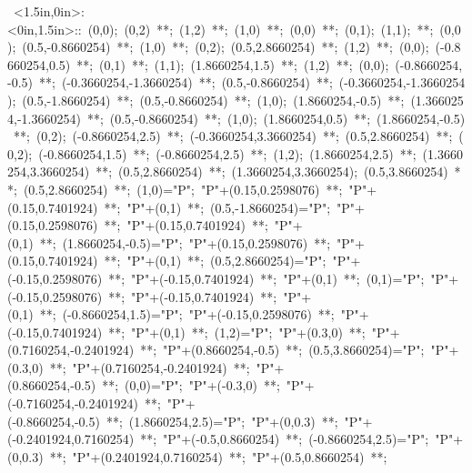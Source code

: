 
% 

\hbox{
\xy    <1.5in,0in>:<0in,1.5in>::
       (0,0); (0,2) **\dir{-}; (1,2) **\dir{-}; (1,0) **\dir{-}; 
       (0,0) **\dir{-}; (0,1); (1,1); **\dir{-};
       (0,0); (0.5,-0.8660254) **\dir{-}; (1,0) **\dir{-};
       (0,2); (0.5,2.8660254) **\dir{-}; (1,2) **\dir{-};
       (0,0); (-0.8660254,0.5) **\dir{-}; (0,1) **\dir{-}; 
       (1,1); (1.8660254,1.5) **\dir{-}; (1,2) **\dir{-}; 
       (0,0); (-0.8660254,-0.5) **\dir{-}; 
         (-0.3660254,-1.3660254) **\dir{-}; (0.5,-0.8660254) **\dir{-};
         (-0.3660254,-1.3660254);  (0.5,-1.8660254) **\dir{-}; 
         (0.5,-0.8660254) **\dir{-};
       (1,0); (1.8660254,-0.5) **\dir{-}; 
         (1.3660254,-1.3660254) **\dir{-}; (0.5,-0.8660254) **\dir{-};
         (1,0); (1.8660254,0.5) **\dir{-}; (1.8660254,-0.5) **\dir{-};
       (0,2); (-0.8660254,2.5) **\dir{-}; 
         (-0.3660254,3.3660254) **\dir{-}; (0.5,2.8660254) **\dir{-};
         (0,2); (-0.8660254,1.5) **\dir{-}; (-0.8660254,2.5) **\dir{-};
       (1,2); (1.8660254,2.5) **\dir{-}; 
         (1.3660254,3.3660254) **\dir{-}; (0.5,2.8660254) **\dir{-};
         (1.3660254,3.3660254);  (0.5,3.8660254) **\dir{-}; 
         (0.5,2.8660254) **\dir{-};
         (1,0)="P"; "P"+(0.15,0.2598076) **\dir{-};  
               "P"+(0.15,0.7401924) **\dir{-}; "P"+(0,1) **\dir{-};
         (0.5,-1.8660254)="P"; "P"+(0.15,0.2598076) **\dir{-};  
               "P"+(0.15,0.7401924) **\dir{-}; "P"+(0,1) **\dir{-};
         (1.8660254,-0.5)="P"; "P"+(0.15,0.2598076) **\dir{-};  
               "P"+(0.15,0.7401924) **\dir{-}; "P"+(0,1) **\dir{-};
         (0.5,2.8660254)="P"; "P"+(-0.15,0.2598076) **\dir{-};  
               "P"+(-0.15,0.7401924) **\dir{-}; "P"+(0,1) **\dir{-};
         (0,1)="P"; "P"+(-0.15,0.2598076) **\dir{-};  
               "P"+(-0.15,0.7401924) **\dir{-}; "P"+(0,1) **\dir{-};
         (-0.8660254,1.5)="P"; "P"+(-0.15,0.2598076) **\dir{-};  
               "P"+(-0.15,0.7401924) **\dir{-}; "P"+(0,1) **\dir{-};
         (1,2)="P"; "P"+(0.3,0) **\dir{-}; "P"+(0.7160254,-0.2401924) **\dir{-};
                "P"+(0.8660254,-0.5) **\dir{-};
         (0.5,3.8660254)="P"; "P"+(0.3,0) **\dir{-}; 
                "P"+(0.7160254,-0.2401924) **\dir{-};
                "P"+(0.8660254,-0.5) **\dir{-};
         (0,0)="P"; "P"+(-0.3,0) **\dir{-}; "P"+(-0.7160254,-0.2401924) **\dir{-};
                "P"+(-0.8660254,-0.5) **\dir{-};
         (1.8660254,2.5)="P"; "P"+(0,0.3) **\dir{-}; 
                "P"+(-0.2401924,0.7160254) **\dir{-};
                "P"+(-0.5,0.8660254) **\dir{-};
         (-0.8660254,2.5)="P"; "P"+(0,0.3) **\dir{-}; 
                "P"+(0.2401924,0.7160254) **\dir{-};
                "P"+(0.5,0.8660254) **\dir{-};
\endxy}

